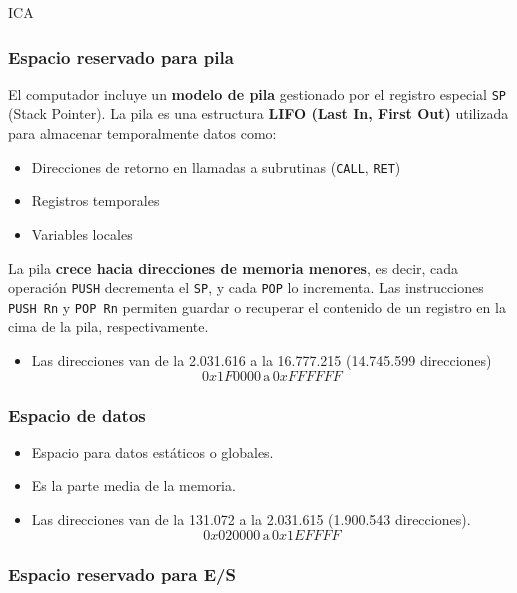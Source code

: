 ICA\documentclass{article}
\begin{document}
\subsubsection{Espacio reservado para pila}

El computador incluye un \textbf{modelo de pila} gestionado por el registro especial \texttt{SP} (Stack Pointer). La pila es una estructura \textbf{LIFO (Last In, First Out)} utilizada para almacenar temporalmente datos como:

\begin{itemize}
  \item Direcciones de retorno en llamadas a subrutinas (\texttt{CALL}, \texttt{RET})
  \item Registros temporales
  \item Variables locales
\end{itemize}

La pila \textbf{crece hacia direcciones de memoria menores}, es decir, cada operación \texttt{PUSH} decrementa el \texttt{SP}, y cada \texttt{POP} lo incrementa. Las instrucciones \texttt{PUSH Rn} y \texttt{POP Rn} permiten guardar o recuperar el contenido de un registro en la cima de la pila, respectivamente.

\begin{itemize}
  \item Las direcciones van de la 2.031.616 a la 16.777.215 (14.745.599 direcciones)
        \[
          0x1F0000 \, \text{a} \, 0xFFFFFF
        \]
\end{itemize}

\subsubsection{Espacio de datos}

\begin{itemize}
  \item Espacio para datos estáticos o globales.
  \item Es la parte media de la memoria.
  \item Las direcciones van de la 131.072 a la 2.031.615 (1.900.543 direcciones).
        \[
          0x020000 \, \text{a} \, 0x1EFFFF
        \]
\end{itemize}

\subsubsection{Espacio reservado para E/S}
\end{document}
